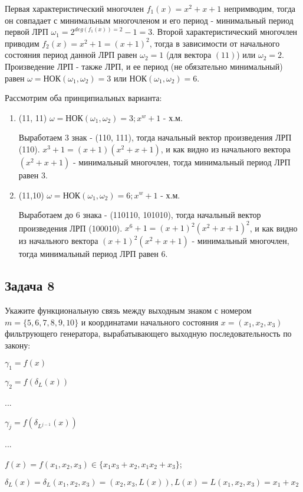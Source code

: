 \documentclass[12pt]{extarticle}
\begin{document}
Первая характеристический многочлен $f_1(x)=x^2+x+1$ непримводим, тогда он совпадает с минимальным многочленом и его период - минимальный период первой ЛРП $\omega_1 = 2^{deg(f_1(x))=2} -1 = 3$. Второй характеристический многочлен приводим $f_2(x)=x^2+1 = (x+1)^2$, тогда в зависимости от начального состояния период данной ЛРП равен $\omega_2 = 1$ (для вектора $(11)$) или $\omega_2 = 2$. Произведение ЛРП - также ЛРП, и ее период (не обязательно минимальный) равен $\omega = $НОК$(\omega_1,\omega_2) = 3$ или НОК$(\omega_1,\omega_2) = 6$.

Рассмотрим оба принципиальных варианта:
\begin{enumerate}
    \item (11, 11)
    $\omega = $НОК$(\omega_1,\omega_2) = 3; x^w+1$ - х.м.
    
    Выработаем 3 знак - (110, 111), тогда начальный вектор произведения ЛРП (110). $x^3+1 = (x+1)(x^2+x+1)$, и как видно из начального вектора $(x^2+x+1)$ - минимальный многочлен, тогда минимальный период ЛРП равен 3.
    \item (11,10)
    $\omega = $НОК$(\omega_1,\omega_2) = 6; x^w+1$ - х.м.
    
    Выработаем до 6 знака - (110110, 101010), тогда начальный вектор произведения ЛРП (100010). $x^6+1 = (x+1)^2(x^2+x+1)^2$, и как видно из начального вектора $(x+1)^2(x^2+x+1)$ - минимальный многочлен, тогда минимальный период ЛРП равен 6.
\end{enumerate}

\subsection{Задача 8}
Укажите функциональную связь между выходным знаком с номером $m = \{5,6,7,8,9,10\}$ и координатами начального состояния $x=(x_1,x_2,x_3)$ фильтрующего генератора, вырабатывающего выходную последовательность по закону: 

$\gamma_1 = f(x)$

$\gamma_2=f(\delta_L(x))$

...

$\gamma_j=f(\delta_{L^{j-1}}(x))$

...

$f(x)=f(x_1,x_2,x_3)\in\{x_1 x_3+x_2, x_1 x_2+x_3\}$;

$\delta_L(x)=\delta_L(x_1,x_2,x_3)=(x_2,x_3,L(x)), L(x)=L(x_1,x_2,x_3)= x_1+x_2$
\end{document}
